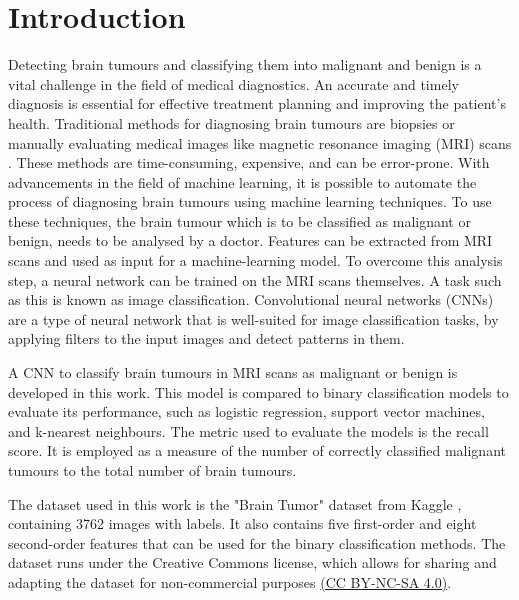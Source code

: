 \chapter{Introduction}
\label{cha:introduction}

Detecting brain tumours and classifying them into malignant and benign is a vital challenge in the field of medical diagnostics. 
An accurate and timely diagnosis is essential for effective treatment planning and improving the patient's health.
Traditional methods for diagnosing brain tumours are biopsies or manually evaluating medical images like magnetic resonance imaging (MRI) scans \cite{CancerResearUK}.
These methods are time-consuming, expensive, and can be error-prone. 
With advancements in the field of machine learning, it is possible to automate the process of diagnosing brain tumours using machine learning techniques. %
To use these techniques, the brain tumour which is to be classified as malignant or benign, needs to be analysed by a doctor.
Features can be extracted from MRI scans and used as input for a machine-learning model.
To overcome this analysis step, a neural network can be trained on the MRI scans themselves.
A task such as this is known as image classification.
Convolutional neural networks (CNNs) are a type of neural network that is well-suited for image classification tasks, by applying filters to the input images and detect patterns in them.

A CNN to classify brain tumours in MRI scans as malignant or benign is developed in this work.
This model is compared to binary classification models to evaluate its performance, such as logistic regression, support vector machines, and k-nearest neighbours.
The metric used to evaluate the models is the recall score. %
It is employed as a measure of the number of correctly classified malignant tumours to the total number of brain tumours.

The dataset used in this work is the "Brain Tumor" dataset from Kaggle \cite{jakesh_bohaju_2020}, containing 3762 images with labels. %
It also contains five first-order and eight second-order features that can be used for the binary classification methods.
The dataset runs under the Creative Commons license, which allows for sharing and adapting the dataset for non-commercial purposes \href{https://creativecommons.org/licenses/by-nc-sa/4.0/}{(CC BY-NC-SA 4.0)}. 

